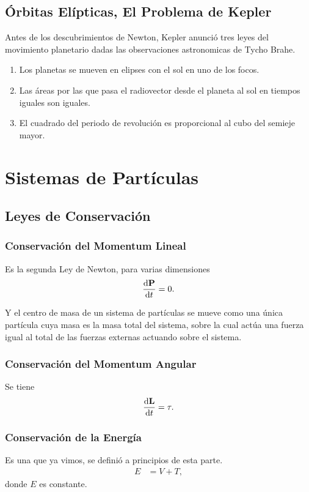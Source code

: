 \section{Órbitas Elípticas, El Problema de Kepler}
Antes de los descubrimientos de Newton, Kepler anunció tres leyes del movimiento planetario dadas las observaciones astronomicas de Tycho Brahe.
\begin{enumerate}
    \item Los planetas se mueven en elipses con el sol en uno de los focos.
    \item Las áreas por las que pasa el radiovector desde el planeta al sol en tiempos iguales son iguales.
    \item El cuadrado del periodo de revolución es proporcional al cubo del semieje mayor.
\end{enumerate}





\chapter{Sistemas de Partículas}
\section{Leyes de Conservación}
\subsection{Conservación del Momentum Lineal}
Es la segunda Ley de Newton, para varias dimensiones
\begin{equation}
    \dv{\vb{P}}{t} = 0.
\end{equation}

Y el centro de masa de un sistema de partículas se mueve como una única partícula cuya masa es la masa total del sistema, sobre la cual actúa una fuerza igual al total de las fuerzas externas actuando sobre el sistema.

\subsection{Conservación del Momentum Angular}
Se tiene
\begin{equation}
    \dv{\vb{L}}{t} = \vb{\tau}.
\end{equation}


\subsection{Conservación de la Energía}
Es una que ya vimos, se definió a principios de esta parte. 
\begin{align}
    E &= V + T,
\end{align}
donde $E$ es constante.






